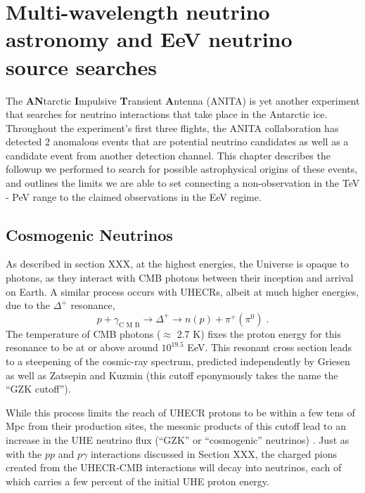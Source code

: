 \chapter{Multi-wavelength neutrino astronomy and EeV neutrino source searches}
\label{sec:ANITA}


The \textbf{AN}tarctic \textbf{I}mpulsive \textbf{T}ransient \textbf{A}ntenna (ANITA) is yet another experiment that searches for neutrino interactions that take place in the Antarctic ice. Throughout the experiment's first three flights, the ANITA collaboration has detected 2 anomalous events that are potential neutrino candidates as well as a candidate event from another detection channel. This chapter describes the followup we performed to search for possible astrophysical origins of these events, and outlines the limits we are able to set connecting a non-observation in the TeV - PeV range to the claimed observations in the EeV regime.


\section{Cosmogenic Neutrinos}
\label{sec:ANITA:cosmogenic}
As described in section XXX, at the highest energies, the Universe is opaque to photons, as they interact with CMB photons between their inception and arrival on Earth. A similar process occurs with UHECRs, albeit at much higher energies, due to the $\Delta^{+}$ resonance, 
\begin{equation}
    \label{eq:delta_cmb}
    p+\gamma_{\text{C M B}} \rightarrow \Delta^{+} \rightarrow n(p)+\pi^{+}\left(\pi^{0}\right) \; .
\end{equation}
The temperature of CMB photons ($\approx$ 2.7 K) fixes the proton energy for this resonance to be at or above around $10^{19.5}$ EeV. This resonant cross section leads to a steepening of the cosmic-ray spectrum, predicted independently by Griesen \cite{Greisen:1966jv} as well as Zatsepin and Kuzmin \cite{Zatsepin:1966jv} (this cutoff eponymously takes the name the ``GZK cutoff''). 

While this process limits the reach of UHECR protons to be within a few tens of Mpc from their production sites, the mesonic products of this cutoff lead to an increase in the UHE neutrino flux (``GZK'' or ``cosmogenic'' neutrinos) \cite{Beresinsky:1969qj}. Just as with the $pp$ and $p\gamma$ interactions discussed in Section XXX, the charged pions created from the UHECR-CMB interactions will decay into neutrinos, each of which carries a few percent of the initial UHE proton energy. 

